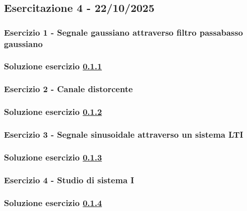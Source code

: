\documentclass[../main.tex]{subfiles}
\begin{document}
\clearpage
\thispagestyle{empty}
\vspace*{7cm}
\subsection{Esercitazione 4 - 22/10/2025}
\vspace*{1.5cm}

\vspace*{1.5cm}
\subsubsection{Esercizio 1 - Segnale gaussiano attraverso filtro passabasso gaussiano}
\label{ss41}

\subsubsection*{Soluzione esercizio \ref{ss41}}

\vspace*{1.5cm}
\subsubsection{Esercizio 2 - Canale distorcente}
\label{ss42}

\subsubsection*{Soluzione esercizio \ref{ss42}}

\vspace*{1.5cm}
\subsubsection{Esercizio 3 - Segnale sinusoidale attraverso un sistema LTI}
\label{ss43}

\subsubsection*{Soluzione esercizio \ref{ss43}}

\vspace*{1.5cm}
\subsubsection{Esercizio 4 - Studio di sistema I}
\label{ss44}

\subsubsection*{Soluzione esercizio \ref{ss44}}
\end{document}
